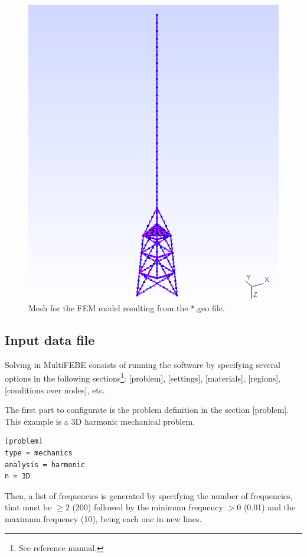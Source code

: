 \documentclass[a4]{article}
\begin{document}
\begin{figure}[tbh!]
	\centering
	\includegraphics[scale=0.6]{mesh1.png}
	\caption{Mesh for the FEM model resulting from the *.geo file.}
	\label{fig:mesh1}
\end{figure}

\subsection{Input data file}
Solving in MultiFEBE consists of running the software by specifying several options in the following sections\footnote{See reference manual.}: [problem], [settings], [materials], [regions], [conditions over nodes], etc.

The first part to configurate is the problem definition in the section [problem]. This example is a 3D harmonic mechanical problem.

\begin{Verbatim}	
[problem]
type = mechanics
analysis = harmonic
n = 3D
\end{Verbatim}

Then, a list of frequencies is generated by specifying the number of frequencies, that must be $\geq 2$ (200) followed by the minimum frequency $>0$ (0.01) and the maximum frequency (10), being each one in new lines.
\end{document}
